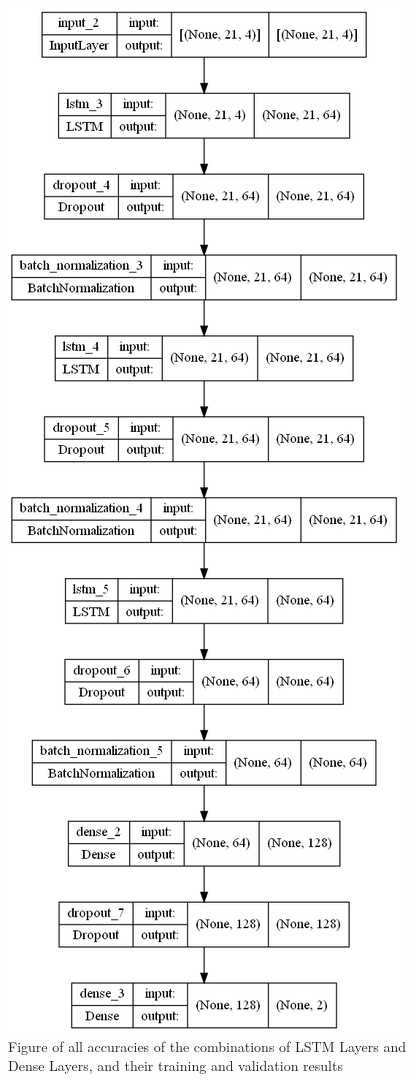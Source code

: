 \begin{figure}[h]
    \centering
    \includegraphics[width=\columnwidth]{figures/results/model_1.png}
    \caption[Figure of accuracies of various layer variables for Iteration 1]{Figure of all accuracies of the combinations of LSTM Layers and Dense Layers, and their training and validation results}
    \label{fig:iteration1_model}
\end{figure}

